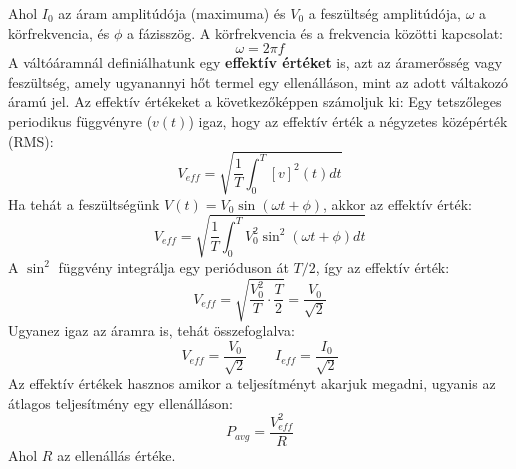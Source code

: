 \documentclass[../main.tex]{subfiles}
\begin{document}
Ahol $I_0$ az áram amplitúdója (maximuma) és $V_0$ a feszültség amplitúdója, $\omega$ a körfrekvencia, és $\phi$ a fázisszög. A körfrekvencia és a frekvencia közötti kapcsolat:
\begin{equation}
    \omega = 2 \pi f
\end{equation}
A váltóáramnál definiálhatunk egy \textbf{effektív értéket} is, azt az áramerősség vagy feszültség, amely ugyanannyi hőt termel egy ellenálláson, mint az adott váltakozó áramú jel. Az effektív értékeket a következőképpen számoljuk ki:
Egy tetszőleges periodikus függvényre ($v(t)$) igaz, hogy az effektív érték a négyzetes középérték (RMS):
\begin{equation}
    V_{eff} = \sqrt{\frac{1}{T} \int_0^T \left[v\right]^2(t) dt}
\end{equation}
Ha tehát a feszültségünk $V(t) = V_0 \sin(\omega t + \phi)$, akkor az effektív érték:
\begin{equation}
    V_{eff} = \sqrt{\frac{1}{T} \int_0^T V_0^2 \sin^2(\omega t + \phi) dt}
\end{equation}
A $\sin^2$ függvény integrálja egy perióduson át $T/2$, így az effektív érték:
\begin{equation}
    V_{eff} = \sqrt{\frac{V_0^2}{T} \cdot \frac{T}{2}} = \frac{V_0}{\sqrt{2}}
\end{equation}
Ugyanez igaz az áramra is, tehát összefoglalva:
\begin{equation}
    \boxed{V_{eff} = \frac{V_0}{\sqrt{2}} \qquad I_{eff} = \frac{I_0}{\sqrt{2}}}
\end{equation}
Az effektív értékek hasznos amikor a teljesítményt akarjuk megadni, ugyanis az átlagos teljesítmény egy ellenálláson:
\begin{equation}
    P_{avg} = \frac{V_{eff}^2}{R}
\end{equation}
Ahol $R$ az ellenállás értéke.
\end{document}
